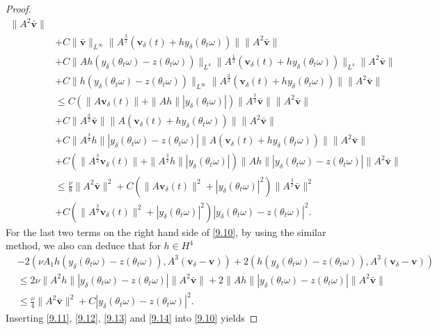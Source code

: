 \documentclass{elsarticle}
\theoremstyle{definition}
\numberwithin{equation}{section}
\begin{document}
\begin{proof}
\begin{align}
\|A^2\bar{\textbf{v}}\|\nonumber\\
&+C\|\bar{\textbf{v}}\|_{L^\infty}\|A^\frac32(\textbf{v}_\delta(t)+hy_\delta(\theta_t\omega))\|
\|A^2\bar{\textbf{v}}\|\nonumber\\
&+C\|Ah(y_\delta(\theta_t\omega)-z(\theta_t\omega))\|_{L^4}\|A^\frac12(\textbf{v}_\delta(t)+hy_\delta(\theta_t\omega))\|_{L^4}
\|A^2\bar{\textbf{v}}\|\nonumber\\
&+C\|h(y_\delta(\theta_t\omega)-z(\theta_t\omega))\|_{L^\infty}\|A^\frac32(\textbf{v}_\delta(t)+hy_\delta(\theta_t\omega))\|
\|A^2\bar{\textbf{v}}\|\nonumber\\
&\leq C(\|A\textbf{v}_\delta(t)\|+\|Ah\||y_\delta(\theta_t\omega)|)\|A^\frac32\bar{\textbf{v}}\|
\|A^2\bar{\textbf{v}}\|\nonumber\\
&+C\|A^\frac32\bar{\textbf{v}}\|\|A(\textbf{v}_\delta(t)+hy_\delta(\theta_t\omega))\|
\|A^2\bar{\textbf{v}}\|\nonumber\\
&+C\|A^\frac32h\||y_\delta(\theta_t\omega)-z(\theta_t\omega)|\|A(\textbf{v}_\delta(t)+hy_\delta(\theta_t\omega))\|
\|A^2\bar{\textbf{v}}\|\nonumber\\
&+C(\|A^\frac32\textbf{v}_\delta(t)\|+\|A^\frac32h\||y_\delta(\theta_t\omega)|)\|Ah\||y_\delta(\theta_t\omega)-z(\theta_t\omega)|
\|A^2\bar{\textbf{v}}\|\nonumber\\
&\leq \frac{\nu}{8}\|A^2\bar{\textbf{v}}\|^2
+C(\|A\textbf{v}_\delta(t)\|^2+|y_\delta(\theta_t\omega)|^2)\|A^\frac32\bar{\textbf{v}}\|^2\nonumber\\
&+C(\|A^\frac32\textbf{v}_\delta(t)\|^2+|y_\delta(\theta_t\omega)|^2)|y_\delta(\theta_t\omega)-z(\theta_t\omega)|^2.
\end{align}
For the last two terms on the right hand side of \eqref{9.10}, by using the similar method, we also can deduce that for $h\in H^4$
\begin{align}\label{9.14}
&-  2(\nu A_1h(y_\delta(\theta_t\omega)-z(\theta_t\omega)),A^3(\textbf{v}_\delta-\textbf{v}))
+2(h(y_\delta (\theta_t\omega)-z(\theta_t\omega)),A^3(\textbf{v}_\delta-\textbf{v}))\nonumber\\
&\leq 2\nu\|A^2h\||y_\delta(\theta_t\omega)-z(\theta_t\omega)|\|A^2\bar{\textbf{v}}\|
+2\|Ah\||y_\delta(\theta_t\omega)-z(\theta_t\omega)|\|A^2\bar{\textbf{v}}\|
\nonumber\\
&\leq \frac{\nu}{4}\|A^2\bar{\textbf{v}}\|^2+C|y_\delta(\theta_t\omega)-z(\theta_t\omega)|^2.
\end{align}
Inserting \eqref{9.11}, \eqref{9.12}, \eqref{9.13} and \eqref{9.14} into \eqref{9.10} yields

\end{proof}
\end{document}
